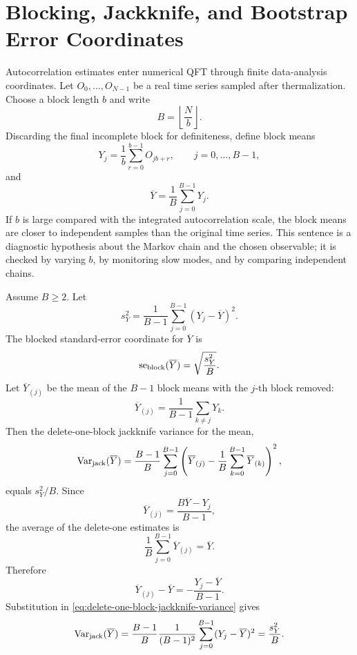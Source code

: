 \section{Blocking, Jackknife, and Bootstrap Error Coordinates}
\label{sec:blocking-jackknife-bootstrap-error-coordinates}

Autocorrelation estimates enter numerical QFT through finite data-analysis
coordinates.  Let \(O_0,\ldots,O_{N-1}\) be a real time series sampled after
thermalization.  Choose a block length \(b\) and write
\[
  B=\left\lfloor\frac{N}{b}\right\rfloor .
\]
Discarding the final incomplete block for definiteness, define block means
\begin{equation}
  Y_j=\frac1b\sum_{r=0}^{b-1}O_{jb+r},
  \qquad j=0,\ldots,B-1,
  \label{eq:block-mean-definition}
\end{equation}
and
\[
  \overline Y=\frac1B\sum_{j=0}^{B-1}Y_j .
\]
If \(b\) is large compared with the integrated autocorrelation scale, the
block means are closer to independent samples than the original time series.
This sentence is a diagnostic hypothesis about the Markov chain and the
chosen observable; it is checked by varying \(b\), by monitoring slow modes,
and by comparing independent chains.

\begin{remark}
\label{rem:block-jackknife-mean-identity}
Assume \(B\ge2\).  Let
\begin{equation}
  s_Y^2=\frac{1}{B-1}\sum_{j=0}^{B-1}(Y_j-\overline Y)^2 .
  \label{eq:block-sample-variance}
\end{equation}
The blocked standard-error coordinate for \(\overline Y\) is
\begin{equation}
  \operatorname{se}_{\rm block}(\overline Y)=\sqrt{\frac{s_Y^2}{B}}.
  \label{eq:block-standard-error}
\end{equation}
Let \(\overline Y_{(j)}\) be the mean of the \(B-1\) block means with the
\(j\)-th block removed:
\begin{equation}
  \overline Y_{(j)}
  =
  \frac{1}{B-1}\sum_{k\ne j}Y_k .
  \label{eq:delete-one-block-mean}
\end{equation}
Then the delete-one-block jackknife variance for the mean,
\begin{equation}
  \operatorname{Var}_{\rm jack}(\overline Y)
  =
  \frac{B-1}{B}\sum_{j=0}^{B-1}
  \left(
    \overline Y_{(j)}
    -
    \frac1B\sum_{k=0}^{B-1}\overline Y_{(k)}
  \right)^2,
  \label{eq:delete-one-block-jackknife-variance}
\end{equation}
equals \(s_Y^2/B\).
Since
\[
  \overline Y_{(j)}
  =
  \frac{B\overline Y-Y_j}{B-1},
  \]
the average of the delete-one estimates is
\[
  \frac1B\sum_{j=0}^{B-1}\overline Y_{(j)}=\overline Y .
  \]
Therefore
\[
  \overline Y_{(j)}-\overline Y
  =
  -\frac{Y_j-\overline Y}{B-1}.
  \]
Substitution in
\eqref{eq:delete-one-block-jackknife-variance} gives
\[
  \operatorname{Var}_{\rm jack}(\overline Y)
  =
  \frac{B-1}{B}
  \frac{1}{(B-1)^2}
  \sum_{j=0}^{B-1}(Y_j-\overline Y)^2
  =
  \frac{s_Y^2}{B}.
  \]
\end{remark}

